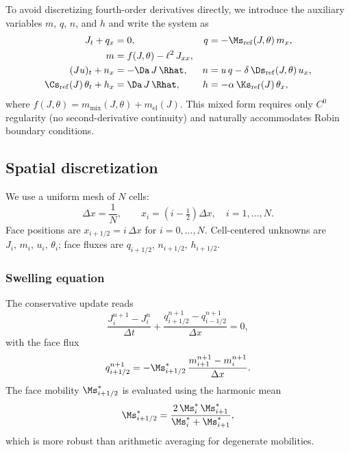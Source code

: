 To avoid discretizing fourth-order derivatives directly, we introduce the auxiliary variables $m$, $q$, $n$, and $h$ and write the system as
\begin{align}
  J_t + q_x &= 0, & q &= -\Ms_\mathrm{ref}(J,\theta)\,m_x, \label{eq:mixed_J} \\
  m &= f(J,\theta) - \ell^2\,J_{xx}, \label{eq:mixed_m} \\
  (Ju)_t + n_x &= -\Da\,J\,\Rhat, & n &= u\,q - \delta\,\Ds_\mathrm{ref}(J,\theta)\,u_x, \label{eq:mixed_u} \\
  \Cs_\mathrm{ref}(J)\,\theta_t + h_x &= \Da\,J\,\Rhat, & h &= -\alpha\,\Ks_\mathrm{ref}(J)\,\theta_x, \label{eq:mixed_T}
\end{align}
where $f(J,\theta) = m_\mathrm{mix}(J,\theta) + m_\mathrm{el}(J)$. This mixed form requires only $C^0$ regularity (no second-derivative continuity) and naturally accommodates Robin boundary conditions.

\subsection{Spatial discretization}

We use a uniform mesh of $N$ cells:
\begin{equation}
  \Delta x = \frac{1}{N},
  \qquad
  x_i = \left(i - \tfrac{1}{2}\right)\Delta x,
  \quad i = 1,\dots,N.
  \label{eq:mesh}
\end{equation}
Face positions are $x_{i+1/2} = i\,\Delta x$ for $i=0,\dots,N$. Cell-centered unknowns are $J_i,\,m_i,\,u_i,\,\theta_i$; face fluxes are $q_{i+1/2},\,n_{i+1/2},\,h_{i+1/2}$.

\subsubsection{Swelling equation}

The conservative update reads
\begin{equation}
  \frac{J_i^{n+1} - J_i^{n}}{\Delta t}
  + \frac{q_{i+1/2}^{n+1} - q_{i-1/2}^{n+1}}{\Delta x} = 0,
  \label{eq:disc_J}
\end{equation}
with the face flux
\begin{equation}
  q_{i+1/2}^{n+1}
  = -\Ms_{i+1/2}^{*}\,
  \frac{m_{i+1}^{n+1} - m_i^{n+1}}{\Delta x}.
  \label{eq:disc_q}
\end{equation}
The face mobility $\Ms_{i+1/2}^{*}$ is evaluated using the harmonic mean
\begin{equation}
  \Ms_{i+1/2}^{*}
  = \frac{2\,\Ms_i^{*}\,\Ms_{i+1}^{*}}{\Ms_i^{*} + \Ms_{i+1}^{*}},
  \label{eq:harm_mean}
\end{equation}
which is more robust than arithmetic averaging for degenerate mobilities.


